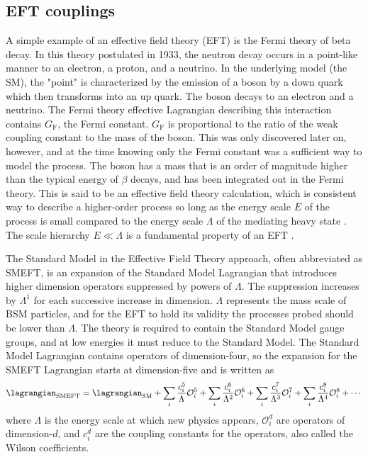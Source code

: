 \subsection{EFT couplings}

A simple example of an effective field theory (EFT) is the Fermi theory of beta decay. In this theory postulated in 1933, the neutron decay occurs in a point-like manner to an electron, a proton, and a neutrino. In the underlying model (the SM), the "point" is characterized by the emission of a \W boson by a down quark which then transforms into an up quark. The \W boson decays to an electron and a neutrino. The Fermi theory effective Lagrangian describing this interaction contains $G_{\text{F}}$, the Fermi constant. $G_{\text{F}}$ is proportional to the ratio of the weak coupling constant to the mass of the \W boson. This was only discovered later on, however, and at the time knowing only the Fermi constant was a sufficient way to model the process. The \W boson has a mass that is an order of magnitude higher than the typical energy of $\beta$ decays, and has been integrated out in the Fermi theory. This is said to be an effective field theory calculation, which is consistent way to describe a higher-order process so long as the energy scale $E$ of the process is small compared to the energy scale $\Lambda$ of the mediating heavy state \cite{De_Simone_2016}. The scale hierarchy $E \ll \Lambda$ is a fundamental property of an EFT \cite{Brehmer2016}.

The Standard Model in the Effective Field Theory approach, often abbreviated as SMEFT, is an expansion of the Standard Model Lagrangian that introduces higher dimension operators suppressed by powers of $\Lambda$. The suppression increases by $\Lambda^1$ for each successive increase in dimension. $\Lambda$ represents the mass scale of BSM particles, and for the EFT to hold its validity the processes probed should be lower than $\Lambda$. The theory is required to contain the Standard Model gauge groups, and at low energies it must reduce to the Standard Model. The Standard Model Lagrangian contains operators of dimension-four, so the expansion for the SMEFT Lagrangian starts at dimension-five and is written as
\begin{equation}
    \lagrangian_{\text{SMEFT}}=\lagrangian_{\text{SM}} + \sum_{i}\dfrac{c_i^5}{\Lambda^{}}\mathcal{O}_i^5 + \sum_{i}\dfrac{c_i^6}{\Lambda^{2}}\mathcal{O}_i^6 + \sum_{i}\dfrac{c_i^7}{\Lambda^{3}}\mathcal{O}_i^7 + 
    \sum_{i}\dfrac{c_i^8}{\Lambda^{4}}\mathcal{O}_i^8 +\cdots
\end{equation}
where $\Lambda$ is the energy scale at which new physics appears, $\mathcal{O}_i^d$ are operators of dimension-$d$, and $c_i^d$ are the coupling constants for the operators, also called the Wilson coefficients. 

